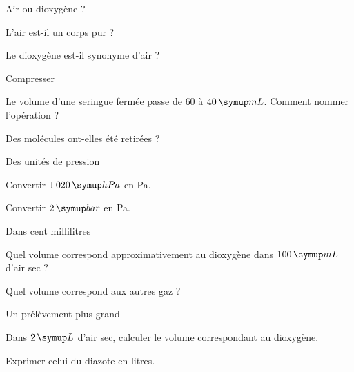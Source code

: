 \par\noindent\begin{minipage}{\linewidth}
\begin{exercice}[1]{Air ou dioxygène ?}
\begin{questions}
\item L’air est-il un corps pur ?
\item Le dioxygène est-il synonyme d’air ?
\end{questions}
\end{exercice}
\end{minipage}
\par\noindent\begin{minipage}{\linewidth}
\begin{exercice}[1]{Compresser}
\begin{questions}
\item Le volume d’une seringue fermée passe de $60$ à $40\unite{mL}$. Comment nommer l’opération ?
\item Des molécules ont-elles été retirées ?
\end{questions}
\end{exercice}
\end{minipage}
\par\noindent\begin{minipage}{\linewidth}
\begin{exercice}[1]{Des unités de pression}
\begin{questions}
\item Convertir $1\,020\unite{hPa}$ en Pa.
\item Convertir $2\unite{bar}$ en Pa.
\end{questions}
\end{exercice}
\end{minipage}
\par\noindent\begin{minipage}{\linewidth}
\begin{exercice}[1]{Dans cent millilitres}
\begin{questions}
\item Quel volume correspond approximativement au dioxygène dans $100\unite{mL}$ d’air sec ?
\item Quel volume correspond aux autres gaz ?
\end{questions}
\end{exercice}
\end{minipage}
\clearpage{}
\par\noindent\begin{minipage}{\linewidth}
\begin{exercice}[2]{Un prélèvement plus grand}
\begin{questions}
\item Dans $2\unite L$ d’air sec, calculer le volume correspondant au dioxygène.
\item Exprimer celui du diazote en litres.
\end{questions}
\end{exercice}
\end{minipage}
